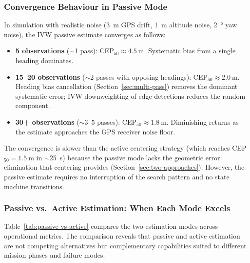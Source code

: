 \subsubsection{Convergence Behaviour in Passive Mode}

In simulation with realistic noise (\SI{3}{\metre} GPS drift, \SI{1}{\metre} altitude noise, \SI{2}{\degree} yaw noise), the IVW passive estimate converges as follows:

\begin{itemize}
  \item \textbf{5 observations} ($\sim$1 pass): CEP$_{50} \approx \SI{4.5}{\metre}$.  Systematic bias from a single heading dominates.
  \item \textbf{15--20 observations} ($\sim$2 passes with opposing headings): CEP$_{50} \approx \SI{2.0}{\metre}$.  Heading bias cancellation (Section~\ref{sec:multi-pass}) removes the dominant systematic error; IVW downweighting of edge detections reduces the random component.
  \item \textbf{30+ observations} ($\sim$3--5 passes): CEP$_{50} \approx \SI{1.8}{\metre}$.  Diminishing returns as the estimate approaches the GPS receiver noise floor.
\end{itemize}

\noindent The convergence is slower than the active centering strategy (which reaches CEP$_{50} = \SI{1.5}{\metre}$ in $\sim$\SI{25}{\second}) because the passive mode lacks the geometric error elimination that centering provides (Section~\ref{sec:two-approaches}).  However, the passive estimate requires no interruption of the search pattern and no state machine transitions.

\subsubsection{Passive vs.\ Active Estimation: When Each Mode Excels}\label{sec:passive-vs-active}

Table~\ref{tab:passive-vs-active} compares the two estimation modes across operational metrics.  The comparison reveals that passive and active estimation are not competing alternatives but complementary capabilities suited to different mission phases and failure modes.


